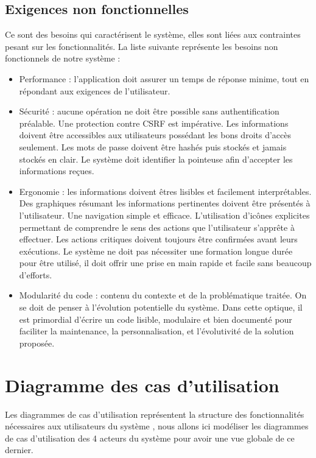 \subsection{Exigences non fonctionnelles}
Ce sont des besoins qui caractérisent le système, elles sont liées aux
contraintes pesant sur les fonctionnalités. La liste suivante représente les
besoins non fonctionnels de notre système :

\begin{itemize}
    \item [\textbullet] Performance : l’application doit assurer un temps de
        réponse minime, tout en répondant aux exigences de l’utilisateur.
    
    \item [\textbullet] Sécurité : aucune opération ne doit être possible sans
        authentification préalable. Une protection contre CSRF est impérative.
        Les informations doivent être accessibles aux utilisateurs possédant les
        bons droits d’accès seulement. Les mots de passe doivent être hashés
        puis stockés et jamais stockés en clair. Le système doit identifier la
        pointeuse afin d’accepter les informations reçues.
    
    \item [\textbullet] Ergonomie : les informations doivent êtres lisibles et
        facilement interprétables. Des graphiques résumant les informations
        pertinentes doivent être présentés à l’utilisateur. Une navigation
        simple et efficace. L’utilisation d’icônes explicites permettant de
        comprendre le sens des actions que l’utilisateur s’apprête à effectuer.
        Les actions critiques doivent toujours être confirmées avant leurs
        exécutions. Le système ne doit pas nécessiter une formation longue durée
        pour être utilisé, il doit offrir une prise en main rapide et facile
        sans beaucoup d’efforts.
    
     \item [\textbullet] Modularité du code : contenu du contexte et de la
         problématique traitée. On se doit de penser à l’évolution potentielle
         du système. Dans cette optique, il est primordial d’écrire un code
         lisible, modulaire et bien documenté pour faciliter la maintenance, la
         personnalisation, et l’évolutivité de la solution proposée.
\end{itemize}
                

\section{Diagramme des cas d'utilisation}
Les diagrammes de cas d’utilisation représentent la structure des
fonctionnalités nécessaires aux utilisateurs du système \cite{6}, nous allons
ici modéliser les diagrammes de cas d’utilisation des 4 acteurs du système pour
avoir une vue globale de ce dernier.

